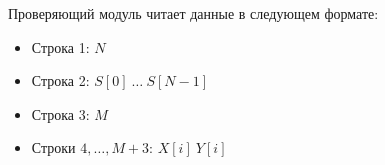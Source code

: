 Проверяющий модуль читает данные в следующем формате:

\begin{itemize}
\item Строка 1: $N$
\item Строка 2: $S[0]\ \ldots\ S[N - 1]$
\item Строка 3: $M$
\item Строки $4, \ldots, M + 3$: $X[i]\ Y[i]$
\end{itemize}